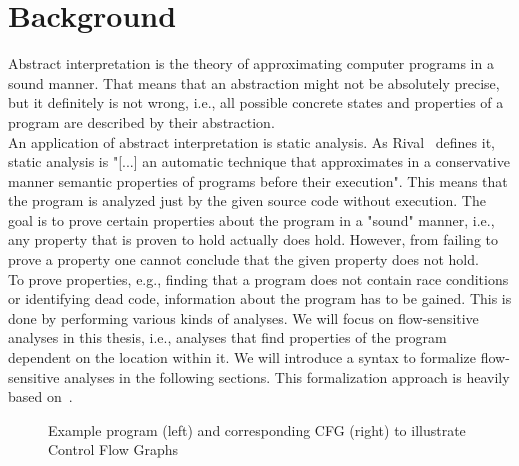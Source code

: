 
\chapter{Background}\label{chapter:background}
  Abstract interpretation is the theory of approximating computer programs in a sound manner. That means that an abstraction might not be absolutely precise, but it definitely is not wrong, i.e., all possible concrete states and properties of a program are described by their abstraction.\\
  An application of abstract interpretation is static analysis. As Rival~\parencite{rival2020introduction} defines it, static analysis is "[...] an automatic technique that approximates in a conservative manner semantic properties of programs before their execution". This means that the program is analyzed just by the given source code without execution. The goal is to prove certain properties about the program in a "sound" manner, i.e., any property that is proven to hold actually does hold. However, from failing to prove a property one cannot conclude that the given property does not hold.\\
  To prove properties, e.g., finding that a program does not contain race conditions or identifying dead code, information about the program has to be gained. This is done by performing various kinds of analyses. We will focus on flow-sensitive analyses in this thesis, i.e., analyses that find properties of the program dependent on the location within it. We will introduce a syntax to formalize flow-sensitive analyses in the following sections. This formalization approach is heavily based on~\parencite{apinis2012side}.

\begin{figure}
  \centering
  \begin{subfigure}{.35\textwidth}
    \centering
    
  \end{subfigure}
  \begin{subfigure}{.35\textwidth}
    \centering
  \end{subfigure}
  \caption[Example program and corresponding CFG to illustrate CFGs.]{Example program (left) and corresponding CFG (right) to illustrate Control Flow Graphs}
  \label{fig:example_cfg}
\end{figure}
  

